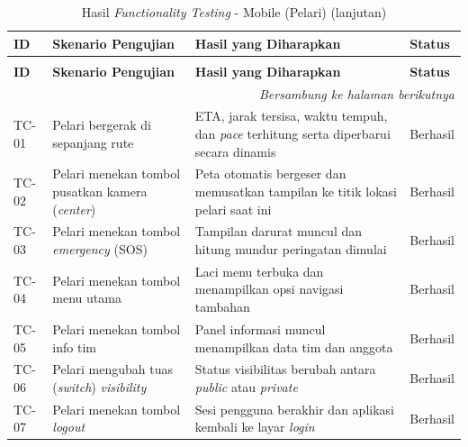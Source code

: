 \begin{longtable}{|p{1.2cm}|p{4.5cm}|p{5cm}|p{2cm}|}
\caption{Hasil \textit{Functionality Testing} - Mobile (Pelari)} \label{tab:functionality-testing-mobile} \\

\hline
\textbf{ID} & \textbf{Skenario Pengujian} & \textbf{Hasil yang Diharapkan} & \textbf{Status} \\ \hline
\endfirsthead

\caption[]{Hasil \textit{Functionality Testing} - Mobile (Pelari) (lanjutan)} \\
\hline
\textbf{ID} & \textbf{Skenario Pengujian} & \textbf{Hasil yang Diharapkan} & \textbf{Status} \\ \hline
\endhead

\hline
\multicolumn{4}{r}{\textit{Bersambung ke halaman berikutnya}} \\
\endfoot

\hline
\endlastfoot

TC-01 & Pelari bergerak di sepanjang rute & ETA, jarak tersisa, waktu tempuh, dan \textit{pace} terhitung serta diperbarui secara dinamis & Berhasil \\ \hline

TC-02 & Pelari menekan tombol pusatkan kamera (\textit{center}) & Peta otomatis bergeser dan memusatkan tampilan ke titik lokasi pelari saat ini & Berhasil \\ \hline

TC-03 & Pelari menekan tombol \textit{emergency} (SOS) & Tampilan darurat muncul dan hitung mundur peringatan dimulai & Berhasil \\ \hline

TC-04 & Pelari menekan tombol menu utama & Laci menu terbuka dan menampilkan opsi navigasi tambahan & Berhasil \\ \hline

TC-05 & Pelari menekan tombol info tim & Panel informasi muncul menampilkan data tim dan anggota & Berhasil \\ \hline

TC-06 & Pelari mengubah tuas (\textit{switch}) \textit{visibility} & Status visibilitas berubah antara \textit{public} atau \textit{private} & Berhasil \\ \hline

TC-07 & Pelari menekan tombol \textit{logout} & Sesi pengguna berakhir dan aplikasi kembali ke layar \textit{login} & Berhasil \\ \hline


\end{longtable}
